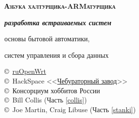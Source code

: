 \begin{titlepage}
\vspace{1cm}

\begin{centering}

{\Huge \textbf{\textsc{Азбука халтурщика-ARMатурщика}}}

{\Huge \textbf{\textit{разработка встраиваемых систем}}}

{\Large 
основы бытовой автоматики,

систем управления и сбора данных
}

\end{centering}

\vspace{1cm}

{\large
\noindent
\copyright\
\href{https://groups.google.com/forum/\#!forum/openwrt2ru}{ruOpenWrt}
\\
\copyright\ HackSpace
<<\href{https://github.com/ponyatov/CHBZ/raw/master/presentation.pdf}{Чебураторный
завод}>>
\\
\copyright\ Консорциум хоббитов России
\\
\copyright\ Bill Collis (Часть \ref{collis})
\\
\copyright\ Joe Martin, Craig Libuse (Часть \ref{stanki})
}
\end{titlepage}
